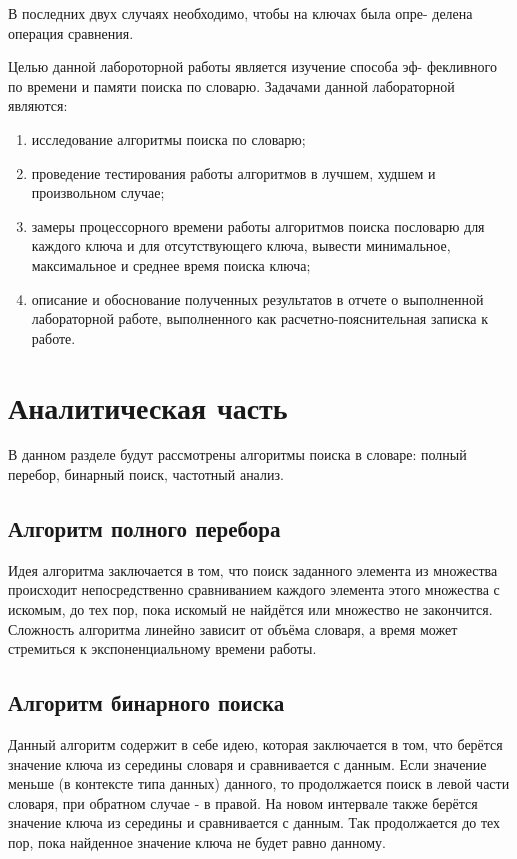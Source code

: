 В последних двух случаях необходимо, чтобы на ключах была опре-
делена операция сравнения.

Целью данной лабороторной работы является изучение способа эф-
фекливного по времени и памяти поиска по словарю. Задачами данной лабораторной являются:

\begin{enumerate}
  \item исследование алгоритмы поиска по словарю;
  \item проведение тестирования работы алгоритмов в лучшем, худшем и произвольном случае;
  \item замеры процессорного времени работы алгоритмов поиска пословарю для каждого ключа и для отсутствующего ключа, вывести минимальное, максимальное и среднее время поиска ключа;
  \item описание и обоснование полученных результатов в отчете о выполненной лабораторной работе, выполненного как расчетно-пояснительная 
  записка к работе.
\end{enumerate}

\chapter{Аналитическая часть}\label{Analis}

В данном разделе будут рассмотрены алгоритмы поиска в словаре: полный перебор, бинарный поиск, частотный анализ.

\section{Алгоритм полного перебора}\label{BubbleSort}

Идея алгоритма заключается в том, что поиск заданного элемента из
множества происходит непосредственно сравниванием каждого элемента этого множества с искомым, 
до тех пор, пока искомый не найдётся или множество не закончится.
Сложность алгоритма линейно зависит от объёма словаря, а время может стремиться к экспоненциальному времени работы.

\section{Алгоритм бинарного поиска}\label{ChoiseSort}

Данный алгоритм содержит в себе идею, которая заключается в том,
что берётся значение ключа из середины словаря и сравнивается с данным.
Если значение меньше (в контексте типа данных) данного, то продолжается
поиск в левой части словаря, при обратном случае - в правой. На новом интервале также берётся значение ключа из середины и сравнивается с данным.
Так продолжается до тех пор, пока найденное значение ключа не будет равно
данному.

